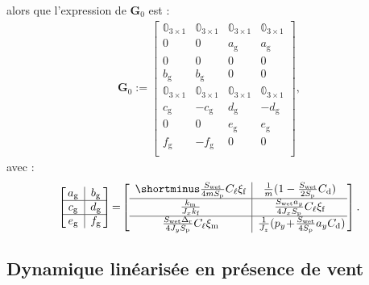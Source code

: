 alors que l'expression de $\boldsymbol{G}_{0}$ est :
\begin{align*}
    \boldsymbol{G}_{0}  := \begin{bmatrix}
    \mathbb{0}_{3\times 1} & \mathbb{0}_{3\times 1} & \mathbb{0}_{3\times 1} & \mathbb{0}_{3\times 1}\\
    0 & 0 & a_{\text{g}} & a_{\text{g}}\\
    0 & 0 & 0 & 0\\
    b_{\text{g}} & b_{\text{g}}  & 0 & 0\\
    \mathbb{0}_{3\times 1} & \mathbb{0}_{3\times 1} & \mathbb{0}_{3\times 1} & \mathbb{0}_{3\times 1}\\
    c_{\text{g}} & -c_{\text{g}} & d_{\text{g}} & -d_{\text{g}}\\
    0 & 0 & e_{\text{g}} & e_{\text{g}}\\
    f_{\text{g}} & -f_{\text{g}} & 0 & 0\\
    \end{bmatrix} , 
\end{align*}
avec : 
\begin{align*}
    \left[\!\! \begin{array}{c|c} 
    a_{\text{g}} & b_{\text{g}} \\ \hline
    c_{\text{g}} & d_{\text{g}} \\ \hline
    e_{\text{g}} & f_{\text{g}}
    \end{array} \!\!\right] \!=\!
    \left[\begin{array}{c|c}
   \shortminus \frac{S_{\text{wet}}}{4mS_{\text{p}}}C_{\ell}\xi_{\text{f}}  & \frac{1}{m}( 1-\frac{S_{\text{wet}}}{2S_{\text{p}}} C_{\text{d}}) \\ \hline
    \frac{k_{\text{m}} }{J_{x}k_{\text{f}}}  &   \! \frac{ S_{\text{wet}} a_{y} }{4 J_{x} S_{\text{p}} } C_{\ell}\xi_{\text{f}} \!\\ \hline
    \!\! \frac{S_{\text{wet}}\Delta_{\text{r}}}{4J_{y}S_{\text{p}}} C_{\ell}\xi_{\text{m}} \!\! & 
    \frac{1}{J_{z}}(p_{y}\!+\!\frac{S_{\text{wet}}}{4S_{\text{p}}} a_{y} C_{\text{d}})\!\!
    \end{array}\right].
\end{align*}

\subsection{Dynamique linéarisée en présence de vent}

